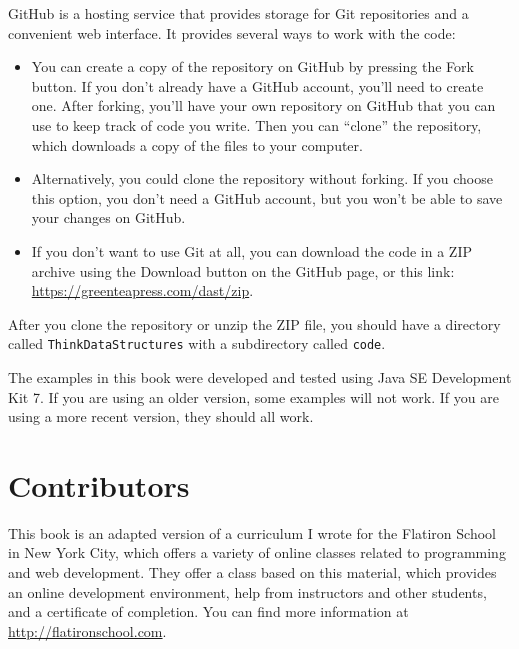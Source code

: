 \documentclass[12pt]{book}
\theoremstyle{exercise}
\begin{document}

GitHub is a hosting service that provides storage for Git repositories
and a convenient web interface.  It provides several ways to work with
the code:

\begin{itemize}

\item You can create a copy of the repository on GitHub by pressing
  the {\sf Fork} button.  If you don't already have a GitHub account,
  you'll need to create one.  After forking, you'll have your own
  repository on GitHub that you can use to keep track of code you
  write.  Then you can ``clone'' the repository, which downloads a
  copy of the files to your computer.


\item Alternatively, you could clone the repository without forking.
  If you choose this option, you don't need a GitHub account, but you
  won't be able to save your changes on GitHub.

\item If you don't want to use Git at all, you can download the code
  in a ZIP archive using the {\sf Download} button on the GitHub
  page, or this link: \url{https://greenteapress.com/dast/zip}.

\end{itemize}

After you clone the repository or unzip the ZIP file, you should have
a directory called {\tt ThinkDataStructures} with a subdirectory
called {\tt code}.

The examples in this book were developed and tested using Java SE
Development Kit 7.  If you are using an older version, some examples
will not work.  If you are using a more recent version, they should
all work.


\section*{Contributors}

This book is an adapted version of a curriculum I wrote for the
Flatiron School in New York City, which offers a variety of online
classes related to programming and web development.  They offer a
class based on this material, which provides an online development
environment, help from instructors and other students, and a
certificate of completion.  You can find more information at
\url{http://flatironschool.com}.
\end{document}
